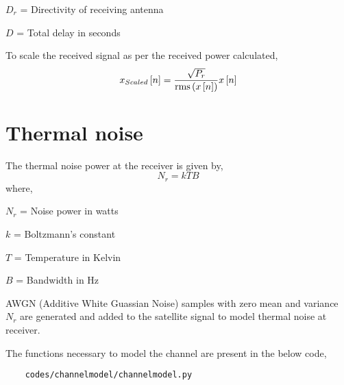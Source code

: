 \documentclass[11pt]{book}
\begin{document}
$D_r$ = Directivity of receiving antenna 

$D$ = Total delay in seconds

To scale the received signal as per the received power calculated,
\begin{equation}
    x_{Scaled}{}\left[n\right] = \frac{\sqrt{P_r}}{\operatorname{rms}\left(x{}\left[n\right]\right)}x{}\left[n\right]
\end{equation}   

\section{Thermal noise}
The thermal noise power at the receiver is given by,
\begin{equation}
    N_r = k T B
\end{equation}
where,

$N_r$ = Noise power in watts

$k$ = Boltzmann's constant

$T$ = Temperature in Kelvin

$B$ = Bandwidth in Hz

AWGN (Additive White Guassian Noise) samples with zero mean and variance $N_r$ are generated and added to the satellite signal to model thermal noise at receiver.

The functions necessary to model the channel are present in the below code,
\begin{lstlisting}
    codes/channelmodel/channelmodel.py
\end{lstlisting}
\end{document}
